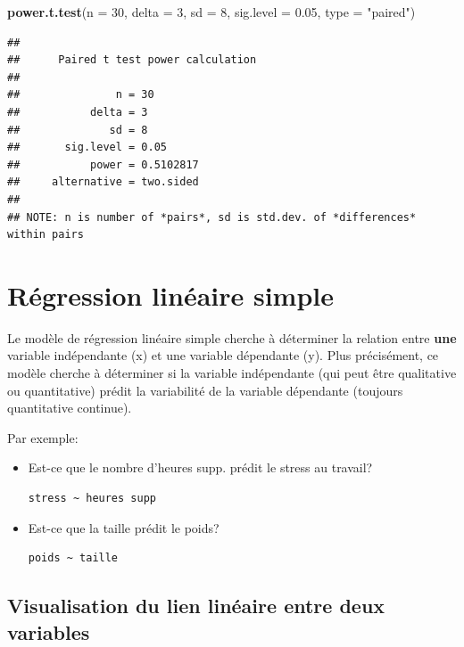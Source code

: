 \documentclass[
]{book}
\newenvironment{Shaded}{\begin{snugshade}}{\end{snugshade}}
\newcommand{\AttributeTok}[1]{\textcolor[rgb]{0.13,0.29,0.53}{#1}}
\newcommand{\DecValTok}[1]{\textcolor[rgb]{0.00,0.00,0.81}{#1}}
\newcommand{\FloatTok}[1]{\textcolor[rgb]{0.00,0.00,0.81}{#1}}
\newcommand{\FunctionTok}[1]{\textcolor[rgb]{0.13,0.29,0.53}{\textbf{#1}}}
\newcommand{\NormalTok}[1]{#1}
\newcommand{\StringTok}[1]{\textcolor[rgb]{0.31,0.60,0.02}{#1}}
\begin{document}
\begin{Shaded}
\begin{Highlighting}[]
\FunctionTok{power.t.test}\NormalTok{(}\AttributeTok{n =} \DecValTok{30}\NormalTok{, }\AttributeTok{delta =} \DecValTok{3}\NormalTok{, }\AttributeTok{sd =} \DecValTok{8}\NormalTok{, }\AttributeTok{sig.level =} \FloatTok{0.05}\NormalTok{, }\AttributeTok{type =} \StringTok{"paired"}\NormalTok{)}
\end{Highlighting}
\end{Shaded}

\begin{verbatim}
## 
##      Paired t test power calculation 
## 
##               n = 30
##           delta = 3
##              sd = 8
##       sig.level = 0.05
##           power = 0.5102817
##     alternative = two.sided
## 
## NOTE: n is number of *pairs*, sd is std.dev. of *differences* within pairs
\end{verbatim}

\chapter{Régression linéaire simple}\label{ruxe9gression-linuxe9aire-simple}

Le modèle de régression linéaire simple cherche à déterminer la relation entre \textbf{une} variable indépendante (x) et une variable dépendante (y). Plus précisément, ce modèle cherche à déterminer si la variable indépendante (qui peut être qualitative ou quantitative) prédit la variabilité de la variable dépendante (toujours quantitative continue).

Par exemple:

\begin{itemize}
\item
  Est-ce que le nombre d'heures supp. prédit le stress au travail?

\begin{verbatim}
stress ~ heures supp
\end{verbatim}
\item
  Est-ce que la taille prédit le poids?

\begin{verbatim}
poids ~ taille
\end{verbatim}
\end{itemize}

\section{Visualisation du lien linéaire entre deux variables}\label{visualisation-du-lien-linuxe9aire-entre-deux-variables}
\end{document}

